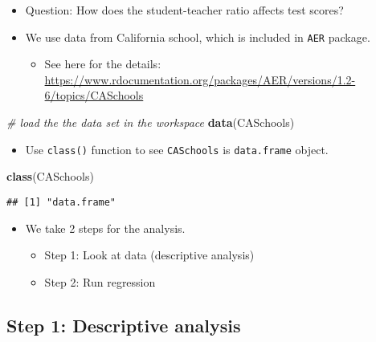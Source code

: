 \documentclass[]{book}
\newenvironment{Shaded}{\begin{snugshade}}{\end{snugshade}}
\newcommand{\KeywordTok}[1]{\textcolor[rgb]{0.13,0.29,0.53}{\textbf{#1}}}
\newcommand{\CommentTok}[1]{\textcolor[rgb]{0.56,0.35,0.01}{\textit{#1}}}
\newcommand{\NormalTok}[1]{#1}
\providecommand{\tightlist}{%
  \setlength{\itemsep}{0pt}\setlength{\parskip}{0pt}}
\begin{document}
\begin{itemize}
\tightlist
\item
  Question: How does the student-teacher ratio affects test scores?
\item
  We use data from California school, which is included in \texttt{AER}
  package.

  \begin{itemize}
  \tightlist
  \item
    See here for the details:
    \url{https://www.rdocumentation.org/packages/AER/versions/1.2-6/topics/CASchools}
  \end{itemize}
\end{itemize}

\begin{Shaded}
\begin{Highlighting}[]
\CommentTok{# load the the data set in the workspace}
\KeywordTok{data}\NormalTok{(CASchools)}
\end{Highlighting}
\end{Shaded}

\begin{itemize}
\tightlist
\item
  Use \texttt{class()} function to see \texttt{CASchools} is
  \texttt{data.frame} object.
\end{itemize}

\begin{Shaded}
\begin{Highlighting}[]
\KeywordTok{class}\NormalTok{(CASchools)}
\end{Highlighting}
\end{Shaded}

\begin{verbatim}
## [1] "data.frame"
\end{verbatim}

\begin{itemize}
\tightlist
\item
  We take 2 steps for the analysis.

  \begin{itemize}
  \tightlist
  \item
    Step 1: Look at data (descriptive analysis)
  \item
    Step 2: Run regression
  \end{itemize}
\end{itemize}

\subsection{Step 1: Descriptive
analysis}\label{step-1-descriptive-analysis}
\end{document}
